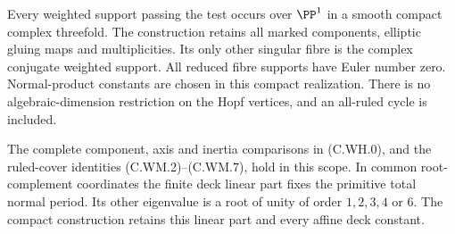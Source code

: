 \begin{proposition}
Every weighted support passing the test occurs over $\PP^1$ in a
smooth compact complex threefold. The construction retains all
marked components, elliptic gluing maps and multiplicities. Its
only other singular fibre is the complex conjugate weighted
support. All reduced fibre supports have Euler number zero.
Normal-product constants are chosen in this compact realization.
There is no algebraic-dimension restriction on the Hopf vertices,
and an all-ruled cycle is included.

The complete component, axis and inertia comparisons in
(C.WH.0), and the ruled-cover identities (C.WM.2)--(C.WM.7),
hold in this scope. In common root-complement coordinates the
finite deck linear part fixes the primitive total normal period.
Its other eigenvalue is a root of unity of order $1,2,3,4$ or $6$.
The compact construction retains this linear part and every
affine deck constant.
\end{proposition}

